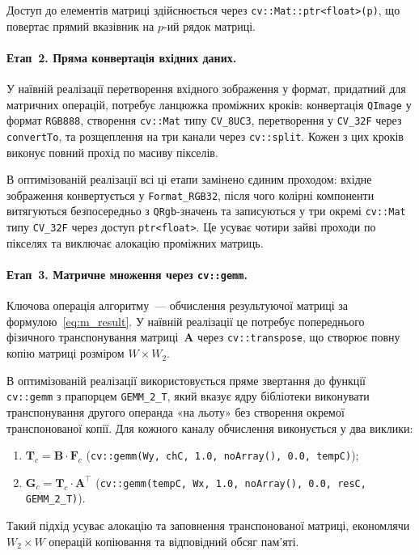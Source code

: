 Доступ до елементів матриці здійснюється через
\texttt{cv::Mat::ptr<float>(p)}, що повертає прямий вказівник на
$p$-ий рядок матриці.

\paragraph{Етап~2. Пряма конвертація вхідних даних.}
У наївній реалізації перетворення вхідного зображення у формат, придатний
для матричних операцій, потребує ланцюжка проміжних кроків: конвертація
\texttt{QImage} у формат \texttt{RGB888}, створення \texttt{cv::Mat}
типу \texttt{CV\_8UC3}, перетворення у \texttt{CV\_32F} через
\texttt{convertTo}, та розщеплення на три канали через \texttt{cv::split}.
Кожен з цих кроків виконує повний прохід по масиву пікселів.

В оптимізованій реалізації всі ці етапи замінено єдиним проходом:
вхідне зображення конвертується у \texttt{Format\_RGB32}, після чого
колірні компоненти витягуються безпосередньо з \texttt{QRgb}-значень та
записуються у три окремі \texttt{cv::Mat} типу \texttt{CV\_32F} через доступ
\texttt{ptr<float>}. Це усуває чотири зайві проходи по пікселях та
виключає алокацію проміжних матриць.

\paragraph{Етап~3. Матричне множення через \texttt{cv::gemm}.}
Ключова операція алгоритму~--- обчислення результуючої матриці за
формулою~\eqref{eq:m_result}. У наївній реалізації це потребує
попереднього фізичного транспонування матриці~$\mathbf{A}$ через
\texttt{cv::transpose}, що створює повну копію матриці розміром
$W \times W_2$.

В оптимізованій реалізації використовується пряме звертання до функції
\texttt{cv::gemm} з прапорцем
\texttt{GEMM\_2\_T}, який вказує ядру бібліотеки виконувати
транспонування другого операнда «на льоту» без створення окремої
транспонованої копії. Для кожного каналу обчислення виконується у два
виклики:
\begin{enumerate}
	\item $\mathbf{T}_c = \mathbf{B} \cdot \mathbf{F}_c$\quad
	(\texttt{cv::gemm(Wy, chC, 1.0, noArray(), 0.0, tempC)});
	\item $\mathbf{G}_c = \mathbf{T}_c \cdot \mathbf{A}^{\!\top}$\quad
	(\texttt{cv::gemm(tempC, Wx, 1.0, noArray(), 0.0, resC, GEMM\_2\_T)}).
\end{enumerate}
Такий підхід усуває алокацію та заповнення транспонованої матриці,
економлячи $W_2 \times W$ операцій копіювання та відповідний обсяг
пам'яті.

